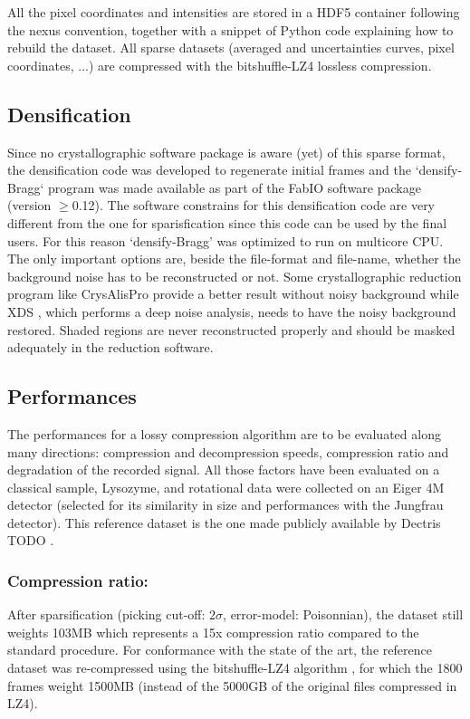 \documentclass[a4paper,12pt,oneside]{article}              %
\begin{document}
All the pixel coordinates and intensities are stored in a HDF5 container \cite{hdf5} following the nexus \cite{nexus} convention, together with a snippet of Python code explaining how to rebuild the dataset.
All sparse datasets (averaged and uncertainties curves, pixel coordinates, ...) are compressed with the bitshuffle-LZ4 \cite{bitshuffle} lossless compression.

\subsection{Densification}
Since no crystallographic software package is aware (yet) of this sparse format, the densification code was developed to regenerate initial frames and the `densify-Bragg` program was made available as part of the FabIO \cite{fabio} software package (version $\ge$0.12). 
The software constrains for this densification code are very different from the one for sparisfication since this code can be used by the final users.
For this reason `densify-Bragg' was optimized to run on multicore CPU.
The only important options are, beside the file-format and file-name, whether the background noise has to be reconstructed or not. 
Some crystallographic reduction program like CrysAlisPro \cite{crysalis} provide a better result without noisy background while XDS \cite{xds}, which performs a deep noise analysis, needs to have the noisy background restored. 
Shaded regions are never reconstructed properly and should be masked adequately in the reduction software.

\subsection{Performances}
The performances for a lossy compression algorithm are to be evaluated along many directions: compression and decompression speeds, compression ratio and degradation of the recorded signal.
All those factors have been evaluated on a classical sample, Lysozyme, and rotational data were collected on an Eiger 4M detector (selected for its similarity in size and performances with the Jungfrau detector). 
This reference dataset is the one made publicly available by Dectris TODO \cite{lysozyme}. 

\subsubsection{Compression ratio:} 
After sparsification (picking cut-off: $2\sigma$, error-model: Poisonnian), the dataset still weights 103MB which represents a 15x compression ratio compared to the standard procedure.
For conformance with the state of the art, the reference dataset was re-compressed using the bitshuffle-LZ4 algorithm \cite{bitshuffle}, for which the 1800 frames weight 1500MB (instead of the 5000GB of the original files compressed in LZ4).
\end{document}
